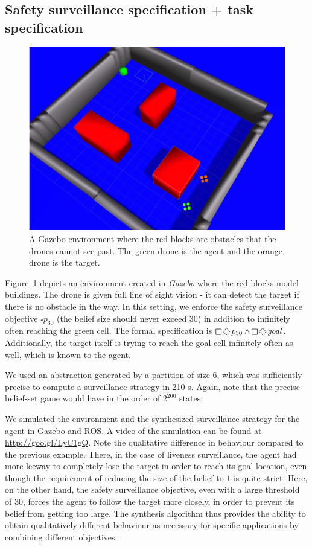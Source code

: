\subsection{Safety surveillance specification + task specification}
\begin{figure}
\centering
\includegraphics[scale=0.13]{figs/ROS_fig.png}\caption{A Gazebo environment where the red blocks are obstacles that the drones cannot see past. The green drone is the agent and the orange drone is the target.}\label{fig:case2}
\vspace{-.5cm}
\end{figure}
Figure~\ref{fig:case2} depicts an environment created in \emph{Gazebo} where the red blocks model buildings. The drone is given full line of sight vision - it can detect the target if there is no obstacle in the way. 
In this setting, we enforce the safety surveillance objective $\square p_{30}$ (the belief size should never exceed 30) in addition to infinitely often reaching the green cell. The formal specification is $\LTLglobally\LTLfinally p_{30} \wedge \LTLglobally\LTLfinally \mathit{goal}$. Additionally, the target itself is trying to reach the goal cell infinitely often as well, which is known to the agent.

We used an abstraction generated by a partition of size 6, which was sufficiently precise to compute a surveillance strategy in 210 s. Again, note that the precise belief-set game would have in the order of $2^{200}$ states.
 
We simulated the environment and the synthesized surveillance strategy for the agent in Gazebo and ROS. A video of the simulation can be found at \url{http://goo.gl/LyC1gQ}. Note the qualitative difference in behaviour compared to the previous example. There, in the case of liveness surveillance, the agent had more leeway to completely lose the target in order to reach its goal location, even though the requirement of reducing the size of the belief to $1$ is quite strict. Here, on the other hand, the safety surveillance objective, even with a large threshold of $30$, forces the agent to follow the target more closely, in order to prevent its belief from getting too large. The synthesis algorithm thus provides the ability to obtain qualitatively different behaviour as necessary for specific applications by combining different objectives. 

